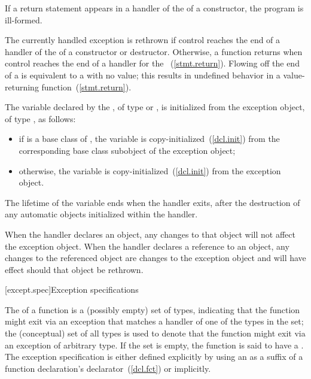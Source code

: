 \pnum
If a return statement appears in a handler of the
of a
constructor, the program is ill-formed.

\pnum
The currently handled exception
is rethrown if control reaches the end of a handler of the
of a constructor or destructor.
Otherwise, a
function returns when control reaches the end of a handler for
the
~(\ref{stmt.return}).
Flowing off the end of a
is equivalent to a
with no value;
this results in undefined behavior in a value-returning function~(\ref{stmt.return}).

\pnum
The variable declared by the , of type
\cv{}  or \cv{} , is initialized from the exception object,
of type , as follows:

\begin{itemize}
\item
if  is a base class of , the variable is
copy-initialized~(\ref{dcl.init}) from the corresponding base class subobject
of the exception object;
\item otherwise, the variable is copy-initialized~(\ref{dcl.init})
from the exception object.
\end{itemize}

The lifetime of the variable ends
when the handler exits, after the
destruction of any automatic objects initialized
within the handler.

\pnum
When the handler declares an object,
any changes to that object will not affect the exception object.
When the handler declares a reference to an object,
any changes to the referenced object are changes to the
exception object and will have effect should that object be rethrown.%
%

[except.spec]{Exception specifications}%

\pnum
{}%
The  of a function
is a (possibly empty) set of types,
indicating that the function might exit
via an exception
that matches a handler of one of the types in the set;
the (conceptual) set of all types is used
to denote that the function might exit
via an exception
of arbitrary type.
If the set is empty,
the function is said to have
a .
The exception specification
is either defined explicitly
by using an 
as a suffix of a function declaration's declarator~(\ref{dcl.fct})
or implicitly.

